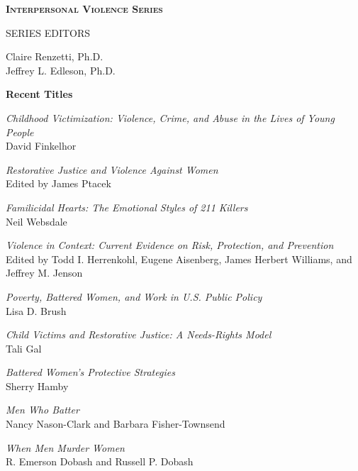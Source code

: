 \documentclass[11pt, twocolumn]{article}
\begin{document}
\thispagestyle{empty}


\clearpage

\thispagestyle{empty}

{\fontsize{10}{13}\selectfont

{\large {\bfseries\scshape Interpersonal Violence Series}}

\vspace{1em}

\raggedright

\textsf{SERIES EDITORS}

Claire Renzetti, Ph.D.\\
Jeffrey L. Edleson, Ph.D.

\textbf{Recent Titles}

\textit{Childhood Victimization: Violence, Crime,
and Abuse in the Lives of Young People}\\
David Finkelhor


\textit{Restorative Justice and Violence Against
Women}\\
Edited by James Ptacek


\textit{Familicidal Hearts: The Emotional Styles of
211 Killers}\\
Neil Websdale

\textit{Violence in Context: Current Evidence on
Risk, Protection, and Prevention}\\
Edited by Todd I. Herrenkohl, Eugene
Aisenberg, James Herbert Williams, and
Jeffrey M. Jenson

\textit{Poverty, Battered Women, and Work in
U.S. Public Policy}\\
Lisa D. Brush

\textit{Child Victims and Restorative Justice: A
Needs-Rights Model}\\
Tali Gal

\textit{Battered Women’s Protective Strategies}\\
Sherry Hamby

\textit{Men Who Batter}\\
Nancy Nason-Clark and Barbara
Fisher-Townsend

\textit{When Men Murder Women}\\
R. Emerson Dobash and Russell P. Dobash

}
\end{document}
